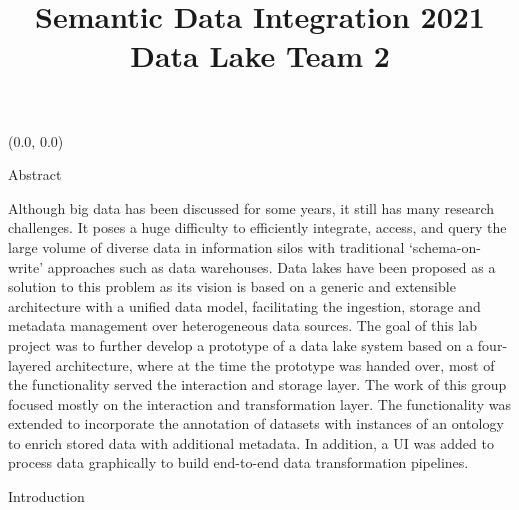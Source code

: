 \documentclass[12pt]{beamer}
\title{Semantic Data Integration 2021 \\ Data Lake Team 2}
\author{\hspace{1em}{\vphantom{Wy}Supervised by Prof. Dr. Christoph Quix and Dr. Christoph Lange-Bever }} %
\begin{document}
\begin{textblock}{0.5}(0.0, 0.0)

\begin{block}{Abstract}

\item Although big data has been discussed for some years, it still has many research challenges. It poses a huge difficulty to efficiently integrate, access, and query the large volume of diverse data in information silos with traditional ‘schema-on-write’ approaches such as data warehouses. Data lakes have been proposed as a solution to this problem as its vision is based on a generic and extensible architecture with a unified data model, facilitating the ingestion, storage and metadata management over heterogeneous data sources. The goal of this lab project was to further develop a prototype of a data lake system based on a four-layered architecture, where at the time the prototype was handed over, most of the functionality served the interaction and storage layer. The work of this group focused mostly on the interaction and transformation layer. The functionality was extended to incorporate the annotation of datasets with instances of an ontology to enrich stored data with additional metadata. In addition, a UI was added to process data graphically to build end-to-end data transformation pipelines.
\end{block}

\begin{block}{Introduction}


\end{block}
\end{textblock}
\end{document}
